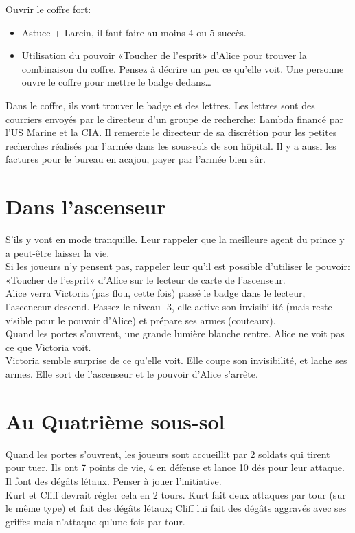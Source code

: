 \documentclass[oneside,12pt]{book}
\begin{document}
\begin{flushleft}
\vspace{0.5cm}
Ouvrir le coffre fort: \\
\begin{itemize}
\item Astuce + Larcin, il faut faire au moins 4 ou 5 succès.
\item Utilisation du pouvoir «Toucher de l'esprit» d'Alice pour trouver la combinaison du coffre. Pensez à décrire un peu ce qu'elle voit. Une personne ouvre le coffre pour mettre le badge dedans…
\end{itemize}
\vspace{0.5cm}
Dans le coffre, ils vont trouver le badge et des lettres. Les lettres sont des courriers envoyés par le directeur d'un groupe de recherche: Lambda financé par l'US Marine et la CIA. Il remercie le directeur de sa discrétion pour les petites recherches réalisés par l'armée dans les sous-sols de son hôpital. Il y a aussi les factures pour le bureau en acajou, payer par l'armée bien sûr.

\section{Dans l'ascenseur}
S'ils y vont en mode tranquille. Leur rappeler que la meilleure agent du prince y a peut-être laisser la vie. \\
Si les joueurs n'y pensent pas, rappeler leur qu'il est possible d'utiliser le pouvoir: «Toucher de l'esprit» d'Alice sur le lecteur de carte de l'ascenseur.\\
Alice verra Victoria (pas flou, cette fois) passé le badge dans le lecteur, l'ascenceur descend. Passez le niveau -3, elle active son invisibilité (mais reste visible pour le pouvoir d'Alice) et prépare ses armes (couteaux).\\
Quand les portes s'ouvrent, une grande lumière blanche rentre. Alice ne voit pas ce que Victoria voit. \\
Victoria semble surprise de ce qu'elle voit. Elle coupe son invisibilité, et lache ses armes. Elle sort de l'ascenseur et le pouvoir d'Alice s'arrête.\\

\section{Au Quatrième sous-sol}
Quand les portes s'ouvrent, les joueurs sont accueillit par 2 soldats qui tirent pour tuer.
Ils ont 7 points de vie, 4 en défense et lance 10 dés pour leur attaque. Il font des dégâts létaux. Penser à jouer l'initiative. \\
Kurt et Cliff devrait régler cela en 2 tours. Kurt fait deux attaques par tour (sur le même type) et fait des dégâts létaux; Cliff lui fait des dégâts aggravés avec ses griffes mais n'attaque qu'une fois par tour.\\



\end{flushleft}
\end{document}
